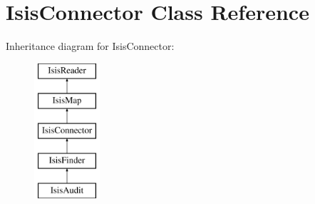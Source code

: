 \hypertarget{classIsisConnector}{
\section{IsisConnector Class Reference}
\label{classIsisConnector}
}
Inheritance diagram for IsisConnector:\begin{figure}[H]
\begin{center}
\leavevmode
\includegraphics[height=5cm]{classIsisConnector}
\end{center}
\end{figure}
